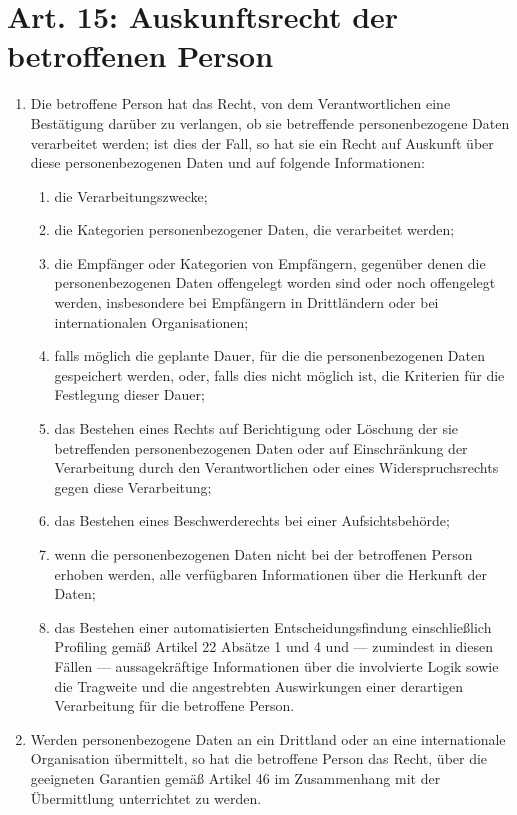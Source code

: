     \section[Art. 15: Auskunftsrecht]{Art. 15: Auskunftsrecht der betroffenen Person}
        \begin{enumerate}[label=(\arabic*)]
            \item Die betroffene Person hat das Recht, von dem Verantwortlichen eine Bestätigung darüber zu verlangen, ob sie betreffende personenbezogene Daten verarbeitet werden; ist dies der Fall, so hat sie ein Recht auf Auskunft über diese personenbezogenen Daten und auf folgende Informationen:
                \begin{enumerate}[label=\alph*)]
                    \item die Verarbeitungszwecke;
                    \item die Kategorien personenbezogener Daten, die verarbeitet werden;
                    \item die Empfänger oder Kategorien von Empfängern, gegenüber denen die personenbezogenen Daten offengelegt worden sind oder noch offengelegt werden, insbesondere bei Empfängern in Drittländern oder bei internationalen Organisationen;
                    \item falls möglich die geplante Dauer, für die die personenbezogenen Daten gespeichert werden, oder, falls dies nicht möglich ist, die Kriterien für die Festlegung dieser Dauer;
                    \item das Bestehen eines Rechts auf Berichtigung oder Löschung der sie betreffenden personenbezogenen Daten oder auf Einschränkung der Verarbeitung durch den Verantwortlichen oder eines Widerspruchsrechts gegen diese Verarbeitung;
                    \item das Bestehen eines Beschwerderechts bei einer Aufsichtsbehörde;
                    \item wenn die personenbezogenen Daten nicht bei der betroffenen Person erhoben werden, alle verfügbaren Informationen über die Herkunft der Daten;
                    \item das Bestehen einer automatisierten Entscheidungsfindung einschließlich Profiling gemäß Artikel 22 Absätze 1 und 4 und — zumindest in diesen Fällen — aussagekräftige Informationen über die involvierte Logik sowie die Tragweite und die angestrebten Auswirkungen einer derartigen Verarbeitung für die betroffene Person.
                \end{enumerate}
            \item Werden personenbezogene Daten an ein Drittland oder an eine internationale Organisation übermittelt, so hat die betroffene Person das Recht, über die geeigneten Garantien gemäß Artikel 46 im Zusammenhang mit der Übermittlung unterrichtet zu werden.

\end{enumerate}

